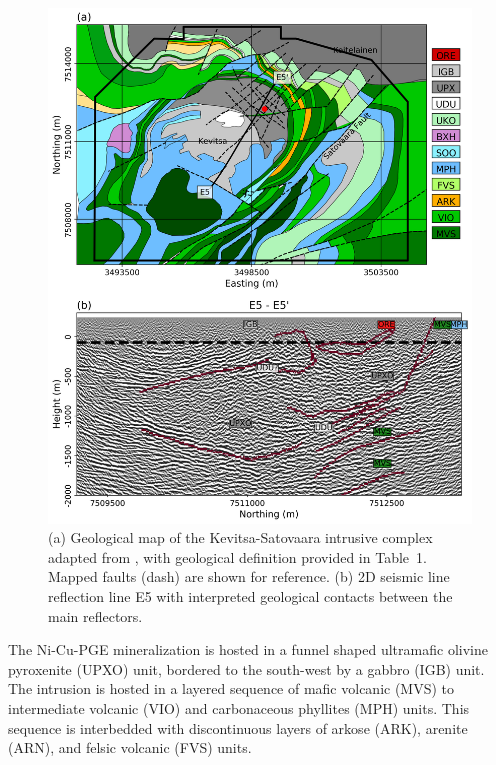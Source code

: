 \documentclass[paper]{geophysics}
\begin{document}
\begin{figure}[p!]
\includegraphics[width=\columnwidth]{Figures/Figure8.png}
\caption{(a) Geological map of the Kevitsa-Satovaara intrusive complex adapted from \cite{Koivisto2015}, with geological definition provided in Table~1. Mapped faults (dash) are shown for reference. (b) 2D seismic line reflection line E5 with interpreted geological contacts between the main reflectors.}
\label{Kevitsa_Geology}
\end{figure}



The Ni-Cu-PGE mineralization is hosted in a funnel shaped ultramafic olivine pyroxenite (UPXO) unit, bordered to the south-west by a gabbro (IGB) unit. The intrusion is hosted in a layered sequence of mafic volcanic (MVS) to intermediate volcanic (VIO) and carbonaceous phyllites (MPH) units. This sequence is interbedded with discontinuous layers of arkose (ARK), arenite (ARN), and felsic volcanic (FVS) units.
\end{document}
